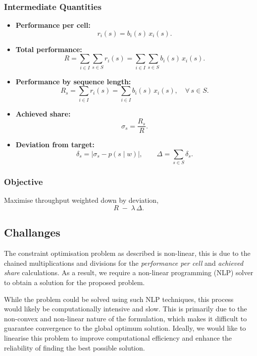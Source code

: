 \subsubsection*{Intermediate Quantities}
\begin{itemize}
  \item \textbf{Performance per cell:}
  \[
    r_i(s) = b_i(s)\,x_i(s).
  \]
  \item \textbf{Total performance:}
  \[
    R = \sum_{i\in I}\sum_{s\in S}r_i(s)
      = \sum_{i\in I}\sum_{s\in S}b_i(s)\,x_i(s).
  \]
  \item \textbf{Performance by sequence length:}
  \[
    R_s = \sum_{i\in I}r_i(s)
        = \sum_{i\in I}b_i(s)\,x_i(s),
    \quad\forall\,s\in S.
  \]
  \item \textbf{Achieved share:}
  \[
    \sigma_s = \frac{R_s}{R}.
  \]
  \item \textbf{Deviation from target:}
  \[
    \delta_s = \bigl|\sigma_s - p(s\mid w)\bigr|,
    \qquad
    \Delta = \sum_{s\in S}\delta_s.
  \]
\end{itemize}

\subsubsection*{Objective}
Maximise throughput weighted down by deviation,
\[
R \;-\;\lambda\,\Delta.
\]

\subsection{Challanges}

The constraint optimisation problem as described is non-linear, this is due to the chained multiplications and divisions for the \textit{performance per cell} and \textit{achieved share} calculations.
 As a result, we require a non-linear programming (NLP) solver to obtain a solution for the proposed problem.

While the problem could be solved using such NLP techniques, this process would likely be computationally intensive and slow.
This is primarily due to the non-convex and non-linear nature of the formulation, which makes it difficult to guarantee convergence to the global optimum solution.
Ideally, we would like to linearise this problem to improve computational efficiency and enhance the reliability of finding the best possible solution.


